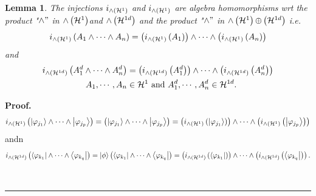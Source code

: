 \documentclass[aps,preprint]{revtex4}%
\newtheorem{lemma}[theorem]{Lemma}
\newenvironment{proof}[1][Proof]{\noindent\textbf{#1.} }{\ \rule{0.5em}{0.5em}}
\begin{document}
\begin{lemma}
The injections $i_{{\huge \wedge}\left(  \mathcal{H}^{1}\right)  }$ and
$i_{{\huge \wedge}\left(  \mathcal{H}^{1}\right)  }$ are \emph{algebra
homomorphisms} wrt the product "$\wedge"$ in ${\huge \wedge}\left(
\mathcal{H}^{1}\right)  ${\normalsize  and } ${\huge \wedge}\left(
\mathcal{H}^{1d}\right)  $ and the product "$\wedge"$ in ${\huge \wedge
}\left(  \mathcal{H}^{1}\right)  {\normalsize \oplus}\left(  \mathcal{H}%
^{1d}\right)  $ i.e.
\begin{equation}
i_{{\huge \wedge}\left(  \mathcal{H}^{1}\right)  }\left(  A_{1}\wedge
\cdots\wedge A_{n}\right)  =\left(  i_{{\huge \wedge}\left(  \mathcal{H}%
^{1}\right)  }\left(  A_{1}\right)  \right)  \wedge\cdots\wedge\left(
i_{{\huge \wedge}\left(  \mathcal{H}^{1}\right)  }\left(  A_{n}\right)
\right)
\end{equation}
and
\begin{align}
i_{{\huge \wedge}\left(  \mathcal{H}^{1d}\right)  }\left(  A_{1}^{d}%
\wedge\cdots\wedge A_{n}^{d}\right)   &  =\left(  i_{{\huge \wedge}\left(
\mathcal{H}^{1d}\right)  }\left(  A_{1}^{d}\right)  \right)  \wedge
\cdots\wedge\left(  i_{{\huge \wedge}\left(  \mathcal{H}^{1d}\right)  }\left(
A_{n}^{d}\right)  \right)  \\
A_{1},\cdots,A_{n} &  \in\mathcal{H}^{1}\text{ and }A_{1}^{d},\cdots,A_{n}%
^{d}\in\mathcal{H}^{1d}.
\end{align}

\end{lemma}

\begin{proof}%
\begin{equation}
i_{{\huge \wedge}\left(  \mathcal{H}^{1}\right)  }\left(  \left\vert
\varphi_{j_{1}}\right\rangle \wedge\cdots\wedge\left\vert \varphi_{j_{p}%
}\right\rangle \right)  =\left(  \left\vert \varphi_{j_{1}}\right\rangle
\wedge\cdots\wedge\left\vert \varphi_{j_{p}}\right\rangle \right)  =\left(
i_{{\huge \wedge}\left(  \mathcal{H}^{1}\right)  }\left(  \left\vert
\varphi_{j_{1}}\right\rangle \right)  \right)  \wedge\cdots\wedge\left(
i_{{\huge \wedge}\left(  \mathcal{H}^{1}\right)  }\left(  \left\vert
\varphi_{j_{p}}\right\rangle \right)  \right)
\end{equation}
andn
\begin{equation}
i_{{\huge \wedge}\left(  \mathcal{H}^{1d}\right)  }\left(  \left\langle
\varphi_{k_{1}}\right\vert \wedge\cdots\wedge\left\langle \varphi_{k_{q}%
}\right\vert \right)  =\left\vert \phi\right\rangle \left(  \left\langle
\varphi_{k_{1}}\right\vert \wedge\cdots\wedge\left\langle \varphi_{k_{q}%
}\right\vert \right)  =\left(  i_{{\huge \wedge}\left(  \mathcal{H}%
^{1d}\right)  }\left(  \left\langle \varphi_{k_{1}}\right\vert \right)
\right)  \wedge\cdots\wedge\left(  i_{{\huge \wedge}\left(  \mathcal{H}%
^{1d}\right)  }\left(  \left\langle \varphi_{k_{q}}\right\vert \right)
\right)  .
\end{equation}

\end{proof}
\end{document}

